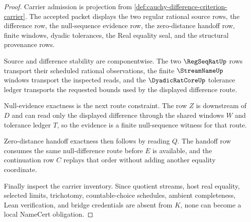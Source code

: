 \begin{proof}
Carrier admission is projection from \autoref{def:cauchy-difference-criterion-carrier}. The accepted packet displays the two regular rational source rows, the difference row, the null-sequence evidence row, the zero-distance handoff row, finite windows, dyadic tolerances, the Real equality seal, and the structural provenance rows.

Source and difference stability are componentwise. The two $\RegSeqRatUp$ rows transport their scheduled rational observations, the finite $\StreamNameUp$ windows transport the inspected reads, and the $\DyadicRatCoreUp$ tolerance ledger transports the requested bounds used by the displayed difference route.

Null-evidence exactness is the next route constraint. The row $Z$ is downstream of $D$ and can read only the displayed difference through the shared windows $W$ and tolerance ledger $T$, so the evidence is a finite null-sequence witness for that route.

Zero-distance handoff exactness then follows by reading $Q$. The handoff row consumes the same null-difference route before $E$ is available, and the continuation row $C$ replays that order without adding another equality coordinate.

Finally inspect the carrier inventory. Since quotient streams, host real equality, selected limits, trichotomy, countable-choice schedules, ambient completeness, Lean verification, and bridge credentials are absent from $K$, none can become a local NameCert obligation.
\end{proof}

